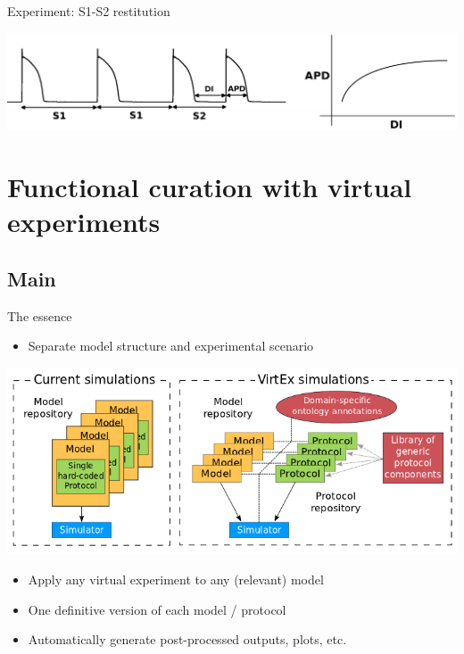 \documentclass[t,xcolor={usenames,dvipsnames}]{beamer}
\newcommand{\subitem}[1]{\begin{itemize}[<.->]\item #1 \end{itemize}}
\begin{document}
\begin{frame}{Experiment: S1-S2 restitution}
\begin{center}
\includegraphics[width=\textwidth]{S1S2}
\end{center}
\end{frame}


\section{Functional curation with virtual experiments}
\subsection*{Main}

\begin{frame}{The essence}
\subitem{Separate \alert{model structure} and \alert{experimental scenario}}
\begin{center}
\includegraphics[width=.9\textwidth]{VirtEx_overview}
\end{center}
\vspace{-.25cm}
\begin{itemize}
\item Apply any \alert{virtual experiment} to any (relevant) model
\item One definitive version of each model / protocol
\item Automatically generate post-processed outputs, plots, etc.
\end{itemize}
\end{frame}
\end{document}
